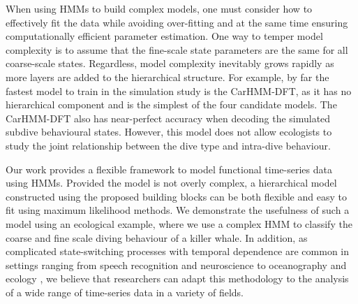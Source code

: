 When using HMMs to build complex models, one must consider how to effectively fit the data while avoiding over-fitting and at the same time ensuring computationally efficient parameter estimation. One way to temper model complexity is to assume that the fine-scale state parameters are the same for all coarse-scale states. Regardless, model complexity inevitably grows rapidly as more layers are added to the hierarchical structure. For example, by far the fastest model to train in the simulation study is the CarHMM-DFT, as it has no hierarchical component and is the simplest of the four candidate models. The CarHMM-DFT also has near-perfect accuracy when decoding the simulated subdive behavioural states. However, this model does not allow  ecologists  to study the joint relationship between the dive type and intra-dive behaviour. 

Our work provides a flexible framework to model functional time-series data using HMMs. Provided the model is not overly complex, a hierarchical model constructed using the proposed building blocks can be both flexible and easy to fit using maximum likelihood methods. We demonstrate the usefulness of such a model using an ecological example, where we use a complex HMM to classify the coarse and fine scale diving behaviour of a killer whale. In addition, as complicated state-switching processes with temporal dependence are common in settings ranging from speech recognition \citep{Juang:1991} and neuroscience \citep{Langrock:2013} to oceanography \citep{Bulla:2012} and ecology \citep{Adam:2019}, we believe that researchers can adapt this methodology to the analysis of a wide range of time-series data in a variety of fields.
